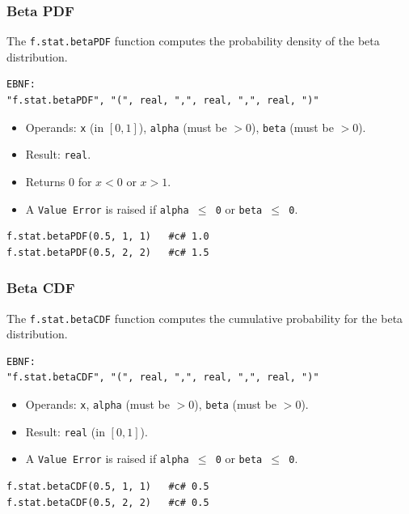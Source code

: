 \subsubsection{Beta PDF}
The \texttt{f.stat.betaPDF} function computes the probability density of the beta distribution.
\begin{verbatim}
EBNF:
"f.stat.betaPDF", "(", real, ",", real, ",", real, ")"
\end{verbatim}
\begin{itemize}
\item Operands: \texttt{x} (in $[0, 1]$), \texttt{alpha} (must be $> 0$), \texttt{beta} (must be $> 0$).
\item Result: \texttt{real}.
\item Returns 0 for $x < 0$ or $x > 1$.
\item A \texttt{Value Error} is raised if \texttt{alpha $\leq$ 0} or \texttt{beta $\leq$ 0}.
\end{itemize}
\begin{verbatim}
f.stat.betaPDF(0.5, 1, 1)   #c# 1.0
f.stat.betaPDF(0.5, 2, 2)   #c# 1.5
\end{verbatim}

\subsubsection{Beta CDF}
The \texttt{f.stat.betaCDF} function computes the cumulative probability for the beta distribution.
\begin{verbatim}
EBNF:
"f.stat.betaCDF", "(", real, ",", real, ",", real, ")"
\end{verbatim}
\begin{itemize}
\item Operands: \texttt{x}, \texttt{alpha} (must be $> 0$), \texttt{beta} (must be $> 0$).
\item Result: \texttt{real} (in $[0, 1]$).
\item A \texttt{Value Error} is raised if \texttt{alpha $\leq$ 0} or \texttt{beta $\leq$ 0}.
\end{itemize}
\begin{verbatim}
f.stat.betaCDF(0.5, 1, 1)   #c# 0.5
f.stat.betaCDF(0.5, 2, 2)   #c# 0.5
\end{verbatim}

